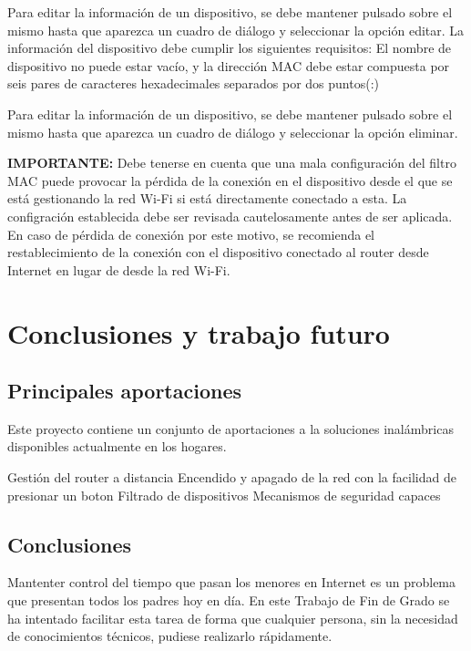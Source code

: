 \documentclass[12pt]{article}
\begin{document}
        Para editar la información de un dispositivo, se debe mantener pulsado sobre el mismo hasta que aparezca un cuadro de diálogo y seleccionar la opción editar. La información del dispositivo debe cumplir los siguientes requisitos: El nombre de dispositivo no puede estar vacío, y la dirección MAC debe estar compuesta por seis pares de caracteres hexadecimales separados por dos puntos(:)

        Para editar la información de un dispositivo, se debe mantener pulsado sobre el mismo hasta que aparezca un cuadro de diálogo y seleccionar la opción eliminar.

        \textbf{IMPORTANTE:} Debe tenerse en cuenta que una mala configuración del filtro MAC puede provocar la pérdida de la conexión en el dispositivo desde el que se está gestionando la red Wi-Fi si está directamente conectado a esta. La configración establecida debe ser revisada cautelosamente antes de ser aplicada. En caso de pérdida de conexión por este motivo, se recomienda el restablecimiento de la conexión con el dispositivo conectado al router desde Internet en lugar de desde la red Wi-Fi.

\section{Conclusiones y trabajo futuro}
    \subsection{Principales aportaciones}
    Este proyecto contiene un conjunto de aportaciones a la soluciones inalámbricas disponibles actualmente en los hogares.
    
    
    Gestión del router a distancia
    Encendido y apagado de la red con la facilidad de presionar un boton
    Filtrado de dispositivos
    Mecanismos de seguridad capaces 

    \subsection{Conclusiones}
    Mantenter control del tiempo que pasan los menores en Internet es un problema que presentan todos los padres hoy en día. En este Trabajo de Fin de Grado se ha intentado facilitar esta tarea de forma que cualquier persona, sin la necesidad de conocimientos técnicos, pudiese realizarlo rápidamente. 
    
\end{document}
